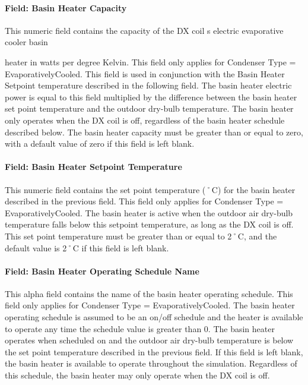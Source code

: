\paragraph{Field: Basin Heater Capacity}\label{field-basin-heater-capacity-4}

This numeric field contains the capacity of the DX coil s electric evaporative cooler basin

heater in watts per degree Kelvin. This field only applies for Condenser Type = EvaporativelyCooled. This field is used in conjunction with the Basin Heater Setpoint temperature described in the following field. The basin heater electric power is equal to this field multiplied by the difference between the basin heater set point temperature and the outdoor dry-bulb temperature. The basin heater only operates when the DX coil is off, regardless of the basin heater schedule described below. The basin heater capacity must be greater than or equal to zero, with a default value of zero if this field is left blank.

\paragraph{Field: Basin Heater Setpoint Temperature}\label{field-basin-heater-setpoint-temperature-4}

This numeric field contains the set point temperature (˚C) for the basin heater described in the previous field. This field only applies for Condenser Type = EvaporativelyCooled. The basin heater is active when the outdoor air dry-bulb temperature falls below this setpoint temperature, as long as the DX coil is off. This set point temperature must be greater than or equal to 2˚C, and the default value is 2˚C if this field is left blank.

\paragraph{Field: Basin Heater Operating Schedule Name}\label{field-basin-heater-operating-schedule-name-4}

This alpha field contains the name of the basin heater operating schedule. This field only applies for Condenser Type = EvaporativelyCooled. The basin heater operating schedule is assumed to be an on/off schedule and the heater is available to operate any time the schedule value is greater than 0. The basin heater operates when scheduled on and the outdoor air dry-bulb temperature is below the set point temperature described in the previous field. If this field is left blank, the basin heater is available to operate throughout the simulation. Regardless of this schedule, the basin heater may only operate when the DX coil is off.


